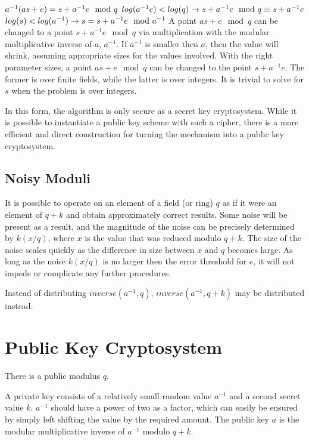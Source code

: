 \documentclass[preprint]{iacrtrans}
\begin{document}
$a^{-1} (a s + e) = s + a^{-1} e \mod q\\ \\$
$log(a^{-1} e) < log(q) \rightarrow s + a^{-1} e \mod q \equiv s + a^{-1} e\\ \\$
$log(s) < log(a^{-1}) \rightarrow s = s + a^{-1} e \mod a^{-1}\\ \\$
A point $a s + e \mod q$  can be changed to a point $s + a^{-1} e \mod q$ via multiplication with the modular multiplicative inverse of $a$, $a^{-1}$. If $a^{-1}$ is smaller then $a$, then the value will shrink, assuming appropriate sizes for the values involved. With the right parameter sizes, a point $a s + e \mod q$ can be changed to the point $s + a^{-1} e$. The former is over finite fields, while the latter is over integers. It is trivial to solve for $s$ when the problem is over integers.

In this form, the algorithm is only secure as a secret key cryptosystem. While it is possible to instantiate a public key scheme with such a cipher, there is a more efficient and direct construction for turning the mechanism into a public key cryptosystem.

\subsection{Noisy Moduli}
It is possible to operate on an element of a field (or ring) $q$ as if it were an element of $q + k$ and obtain approximately correct results. Some noise will be present as a result, and the magnitude of the noise can be precisely determined by $k (x / q)$, where $x$ is the value that was reduced modulo $q + k$. The size of the noise scales quickly as the difference in size between $x$ and $q$ becomes large. As long as the noise $k (x / q)$ is no larger then the error threshold for $e$, it will not impede or complicate any further procedures.

Instead of distributing $inverse(a^{-1}, q)$, $inverse(a^{-1}, q + k)$ may be distributed instead.

\section{Public Key Cryptosystem}
There is a public modulus $q$. 

A private key consists of a relatively small random value $a^{-1} $ and a second secret value $k$. $a^{-1}$ should have a power of two as a factor, which can easily be ensured by simply left shifting the value by the required amount. The public key $a$ is the modular multiplicative inverse of $a^{-1}$ modulo $q + k$.
\end{document}
